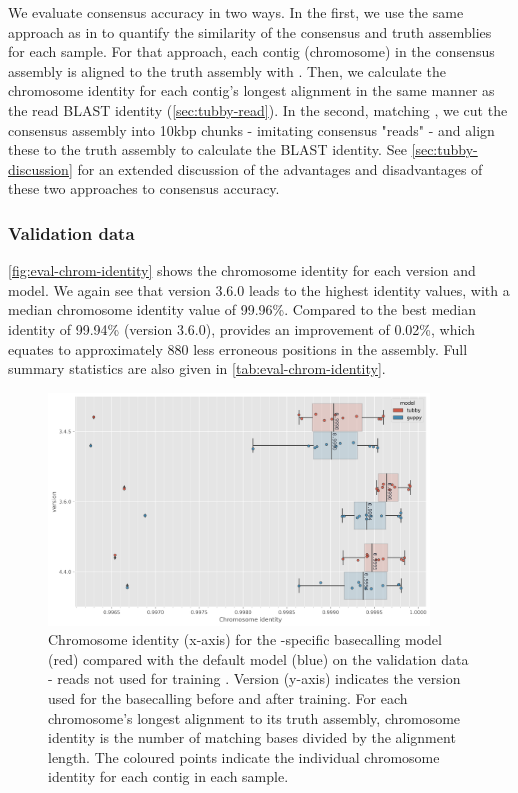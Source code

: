 We evaluate consensus accuracy in two ways. In the first, we use the same approach as in \cite{wick2020} to quantify the similarity of the consensus and truth assemblies for each sample. For that approach, each contig (chromosome) in the consensus assembly is aligned to the truth assembly with . Then, we calculate the chromosome identity for each contig's longest alignment in the same manner as the read BLAST identity (\autoref{sec:tubby-read}). In the second, matching \cite{wick2019}, we cut the consensus assembly into 10kbp chunks - imitating consensus "reads" - and align these to the truth assembly to calculate the BLAST identity. See \autoref{sec:tubby-discussion} for an extended discussion of the advantages and disadvantages of these two approaches to consensus accuracy.

\subsubsection{Validation data}

\autoref{fig:eval-chrom-identity} shows the chromosome identity for each version and model. We again see that \tubby{} version 3.6.0 leads to the highest identity values, with a median chromosome identity value of 99.96\%. Compared to the best median \guppy{} identity of 99.94\% (version 3.6.0), \tubby{} provides an improvement of 0.02\%, which equates to approximately 880 less erroneous positions in the \mtb{} assembly. Full summary statistics are also given in \autoref{tab:eval-chrom-identity}.

\begin{figure}
\includegraphics[width=0.9\textwidth]{Chapter4/Figs/eval_chromosome_identity.png}
\centering
\caption{Chromosome identity (x-axis) for the \mtb{}-specific basecalling model \tubby{} (red) compared with the default \guppy{} model (blue) on the validation data - \mtb{} reads not used for training \tubby{}. Version (y-axis) indicates the \guppy{} version used for the basecalling before and after training. For each chromosome's longest alignment to its truth assembly, chromosome identity is the number of matching bases divided by the alignment length. The coloured points indicate the individual chromosome identity for each contig in each sample.}
\label{fig:eval-chrom-identity}
\end{figure}

